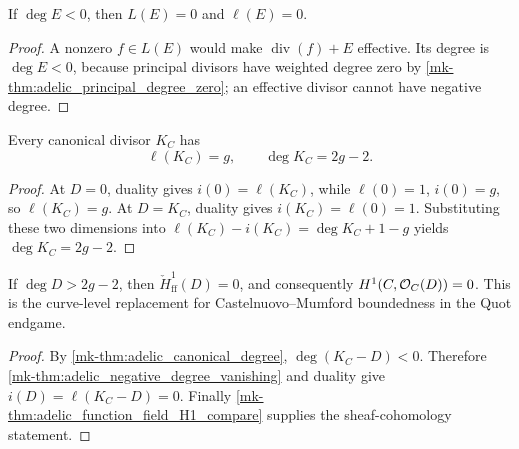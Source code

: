 \begin{lemma}
  \label{mk-thm:adelic_negative_degree_vanishing}
  If \(\deg E<0\), then \(L(E)=0\) and \(\ell(E)=0\).
\end{lemma}
\begin{proof}
  A nonzero \(f\in L(E)\) would make
  \(\operatorname{div}(f)+E\) effective.  Its degree is \(\deg E<0\),
  because principal divisors have weighted degree zero by
  \ref{mk-thm:adelic_principal_degree_zero}; an effective divisor cannot
  have negative degree.
\end{proof}

\begin{theorem}
  \label{mk-thm:adelic_canonical_degree}
  \notready
  Every canonical divisor \(K_C\) has
  \[
    \ell(K_C)=g,
    \qquad \deg K_C=2g-2.
  \]
\end{theorem}
\begin{proof}
  At \(D=0\), duality gives \(i(0)=\ell(K_C)\), while
  \(\ell(0)=1\), \(i(0)=g\), so \(\ell(K_C)=g\).  At \(D=K_C\),
  duality gives \(i(K_C)=\ell(0)=1\).  Substituting these two dimensions
  into \(\ell(K_C)-i(K_C)=\deg K_C+1-g\) yields
  \(\deg K_C=2g-2\).
\end{proof}

\begin{corollary}
[Vanishing: \(i(D) = 0\) for \(\deg D > 2g - 2\)]
  \label{mk-thm:adelic_h1_vanishing}
  \notready
  If \(\deg D>2g-2\), then
  \(\check H^1_{\mathrm{ff}}(D)=0\), and consequently
  \(H^1(C,\mathcal{O}_{C}(D))=0\).  This is the curve-level replacement for
  Castelnuovo--Mumford boundedness in the Quot endgame.
\end{corollary}
\begin{proof}
  By \ref{mk-thm:adelic_canonical_degree}, \(\deg(K_C-D)<0\).  Therefore
  \ref{mk-thm:adelic_negative_degree_vanishing} and duality give
  \(i(D)=\ell(K_C-D)=0\).  Finally
  \ref{mk-thm:adelic_function_field_H1_compare} supplies the sheaf-cohomology
  statement.
\end{proof}

